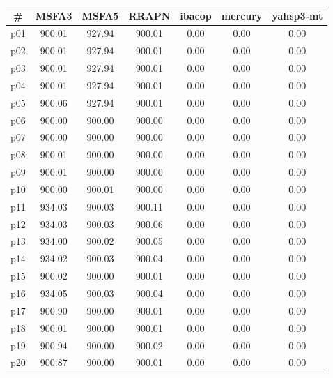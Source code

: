 \begin{tabular}{ccccccc}
\toprule
\textbf{\#} & \textbf{MSFA3} & \textbf{MSFA5} & \textbf{RRAPN} & \textbf{ibacop} & \textbf{mercury} & \textbf{yahsp3-mt}\\
\midrule
p01 & 900.01 & 927.94 & 900.01 & 0.00 & 0.00 & 0.00\\
p02 & 900.01 & 927.94 & 900.01 & 0.00 & 0.00 & 0.00\\
p03 & 900.01 & 927.94 & 900.01 & 0.00 & 0.00 & 0.00\\
p04 & 900.01 & 927.94 & 900.01 & 0.00 & 0.00 & 0.00\\
p05 & 900.06 & 927.94 & 900.01 & 0.00 & 0.00 & 0.00\\
p06 & 900.00 & 900.00 & 900.00 & 0.00 & 0.00 & 0.00\\
p07 & 900.00 & 900.00 & 900.00 & 0.00 & 0.00 & 0.00\\
p08 & 900.01 & 900.00 & 900.00 & 0.00 & 0.00 & 0.00\\
p09 & 900.01 & 900.00 & 900.00 & 0.00 & 0.00 & 0.00\\
p10 & 900.00 & 900.01 & 900.00 & 0.00 & 0.00 & 0.00\\
p11 & 934.03 & 900.03 & 900.11 & 0.00 & 0.00 & 0.00\\
p12 & 934.03 & 900.03 & 900.06 & 0.00 & 0.00 & 0.00\\
p13 & 934.00 & 900.02 & 900.05 & 0.00 & 0.00 & 0.00\\
p14 & 934.02 & 900.03 & 900.04 & 0.00 & 0.00 & 0.00\\
p15 & 900.02 & 900.00 & 900.01 & 0.00 & 0.00 & 0.00\\
p16 & 934.05 & 900.03 & 900.04 & 0.00 & 0.00 & 0.00\\
p17 & 900.90 & 900.00 & 900.01 & 0.00 & 0.00 & 0.00\\
p18 & 900.01 & 900.00 & 900.01 & 0.00 & 0.00 & 0.00\\
p19 & 900.94 & 900.00 & 900.02 & 0.00 & 0.00 & 0.00\\
p20 & 900.87 & 900.00 & 900.01 & 0.00 & 0.00 & 0.00\\
\bottomrule
\end{tabular}

